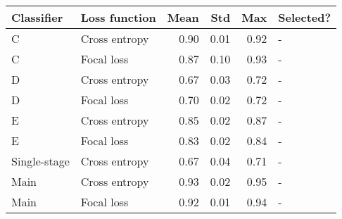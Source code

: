 \begin{tabular}{llrrrl}
\toprule
\textbf{Classifier} & \textbf{Loss function} &  \textbf{Mean} &  \textbf{Std} &  \textbf{Max} & \textbf{Selected?} \\
\midrule
                  C &          Cross entropy &           0.90 &          0.01 &          0.92 &                  - \\
                  C &             Focal loss &           0.87 &          0.10 &          0.93 &                  - \\
                  D &          Cross entropy &           0.67 &          0.03 &          0.72 &                  - \\
                  D &             Focal loss &           0.70 &          0.02 &          0.72 &                  - \\
                  E &          Cross entropy &           0.85 &          0.02 &          0.87 &                  - \\
                  E &             Focal loss &           0.83 &          0.02 &          0.84 &                  - \\
       Single-stage &          Cross entropy &           0.67 &          0.04 &          0.71 &                  - \\
               Main &          Cross entropy &           0.93 &          0.02 &          0.95 &                  - \\
               Main &             Focal loss &           0.92 &          0.01 &          0.94 &                  - \\
\bottomrule
\end{tabular}
